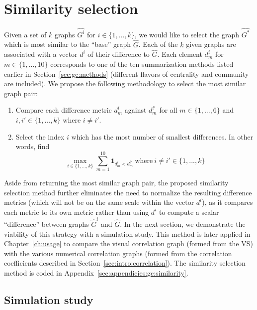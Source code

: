 \section{Similarity selection}
\label{sec:gc:simulations}

Given a set of $k$ graphs $\hat{G^i}$ for $i \in \{1,...,k\}$, we would like to 
select the graph $\hat{G^*}$ which is most similar to the ``base'' graph 
$\hat{G}$. Each of the $k$ given graphs are associated with a vector 
$d^{i}$ of their difference to $\hat{G}$. Each element $d^{i}_m$ for $m \in 
\{1,...,10\}$ corresponds to one of the ten summarization methods listed 
earlier in Section~\ref{sec:gc:methods} (different flavors of 
centrality and community are included). 
We propose the following methodology to select the most similar graph pair:

\tablespacing
\begin{enumerate}
	\item Compare each difference metric $d^{i}_m$ against 
	$d^{i'}_m$ for all $m \in \{1,...,6\}$ and $i,i' \in 
	\{1,...,k\}$ where $i \neq i'$. 
	\item Select the index $i$ which has the most number of smallest 
	differences. In other words, find
	$$\max\limits_{i \in \{1,...,k\}} 
	\sum\limits^{10}_{m=1} \textbf{1}_{d^{i}_m < d^{i'}_m} \ \text{where} \ i 
	\neq i' \in \{1,...,k\}$$
\end{enumerate}
\bodyspacing

Aside from returning the most similar graph pair, the proposed similarity 
selection method further eliminates the need to normalize the resulting 
difference metrics (which will not be on the same scale within the vector
$d^i$), as it compares each metric to its own metric rather 
than using $d^i$ to compute a scalar ``difference'' between graphs 
$\hat{G}^i$ and $\hat{G}$. In the next section, we demonstrate the viability of 
this strategy with a simulation study. This method is later applied in 
Chapter~\ref{ch:usage} to compare the visual correlation graph (formed from the 
VS) with the various numerical correlation graphs (formed from the correlation 
coefficients described in Section~\ref{sec:intro:correlation}).
The similarity selection method is coded in 
Appendix~\ref{sec:appendicies:gc:similarity}.

\subsection{Simulation study}
\label{sec:gc:simulations:algorithm}


